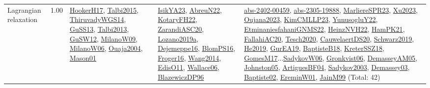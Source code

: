 {\begin{longtable}{p{3cm}r>{\raggedright\arraybackslash}p{6cm}>{\raggedright\arraybackslash}p{6cm}>{\raggedright\arraybackslash}p{8cm}}
\index{Lagrangian relaxation}\index{Algorithms!Lagrangian relaxation}Lagrangian relaxation &  1.00 & \hyperref[detail:HookerH17]{HookerH17}, \hyperref[detail:Talbi2015]{Talbi2015}, \hyperref[detail:ThiruvadyWGS14]{ThiruvadyWGS14}, \hyperref[detail:GuSS13]{GuSS13}, \hyperref[detail:Talbi2013]{Talbi2013}, \hyperref[detail:GuSW12]{GuSW12}, \hyperref[detail:MilanoW09]{MilanoW09}, \hyperref[detail:MilanoW06]{MilanoW06}, \hyperref[detail:Ouaja2004]{Ouaja2004}, \hyperref[detail:Mason01]{Mason01} & \hyperref[detail:IsikYA23]{IsikYA23}, \hyperref[detail:AbreuN22]{AbreuN22}, \hyperref[detail:KotaryFH22]{KotaryFH22}, \hyperref[detail:ZarandiASC20]{ZarandiASC20}, \hyperref[detail:Lozano2019a]{Lozano2019a}, \hyperref[detail:Dejemeppe16]{Dejemeppe16}, \hyperref[detail:BlomPS16]{BlomPS16}, \hyperref[detail:Froger16]{Froger16}, \hyperref[detail:Wang2014]{Wang2014}, \hyperref[detail:EdisO11]{EdisO11}, \hyperref[detail:Wallace06]{Wallace06}, \hyperref[detail:BlazewiczDP96]{BlazewiczDP96} & \hyperref[detail:abs-2402-00459]{abs-2402-00459}, \hyperref[detail:abs-2305-19888]{abs-2305-19888}, \hyperref[detail:MarliereSPR23]{MarliereSPR23}, \hyperref[detail:Xu2023]{Xu2023}, \hyperref[detail:Oujana2023]{Oujana2023}, \hyperref[detail:KimCMLLP23]{KimCMLLP23}, \hyperref[detail:YunusogluY22]{YunusogluY22}, \hyperref[detail:EtminaniesfahaniGNMS22]{EtminaniesfahaniGNMS22}, \hyperref[detail:HeinzNVH22]{HeinzNVH22}, \hyperref[detail:HamPK21]{HamPK21}, \hyperref[detail:FallahiAC20]{FallahiAC20}, \hyperref[detail:Tesch2020]{Tesch2020}, \hyperref[detail:CauwelaertDS20]{CauwelaertDS20}, \hyperref[detail:Schwarz2019]{Schwarz2019}, \hyperref[detail:He2019]{He2019}, \hyperref[detail:GurEA19]{GurEA19}, \hyperref[detail:BaptisteB18]{BaptisteB18}, \hyperref[detail:KreterSSZ18]{KreterSSZ18}, \hyperref[detail:GomesM17]{GomesM17}...\hyperref[detail:SadykovW06]{SadykovW06}, \hyperref[detail:Gronkvist06]{Gronkvist06}, \hyperref[detail:DemasseyAM05]{DemasseyAM05}, \hyperref[detail:Johnston05]{Johnston05}, \hyperref[detail:ArtiguesBF04]{ArtiguesBF04}, \hyperref[detail:Sadykov2003]{Sadykov2003}, \hyperref[detail:Demassey03]{Demassey03}, \hyperref[detail:Baptiste02]{Baptiste02}, \hyperref[detail:EreminW01]{EreminW01}, \hyperref[detail:JainM99]{JainM99} (Total: 42)\\

\end{longtable}}
